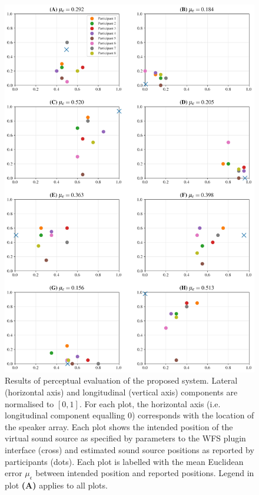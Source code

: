 \documentclass[utf8]{FrontiersinHarvard}
\begin{document}
    \begin{figure}[h!]
        \centering
        \includegraphics[width=.75\textwidth]{figures/subjective}
        \caption{
            Results of perceptual evaluation of the proposed system.
            Lateral (horizontal axis) and longitudinal (vertical axis) components
            are normalised to $[0, 1]$.
            For each plot, the horizontal axis (i.e. longitudinal component
            equalling 0) corresponds with the location of the speaker array.
            Each plot shows the intended position of the virtual sound source as
            specified by parameters to the WFS plugin interface (cross) and
            estimated sound source positions as reported by participants (dots).
            Each plot is labelled with the mean Euclidean error $\mu_\epsilon$
            between intended position and reported positions.
            Legend in plot \textbf{(A)} applies to all plots.
        }
        \label{fig:perceptual}
    \end{figure}
\end{document}
